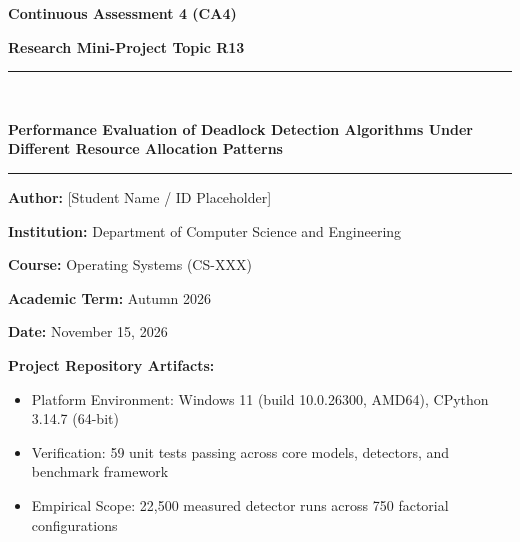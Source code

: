 \documentclass[11pt,a4paper]{article}
\begin{document}
\begin{titlepage}
    \centering
    \vspace*{1.5cm}
    
    {\Huge\bfseries Continuous Assessment 4 (CA4) \par}
    \vspace{0.4cm}
    {\LARGE\bfseries Research Mini-Project Topic R13 \par}
    \vspace{1.0cm}
    
    \rule{\linewidth}{1.2pt} \\[0.4cm]
    {\huge\bfseries Performance Evaluation of Deadlock Detection Algorithms Under Different Resource Allocation Patterns \par}
    \rule{\linewidth}{1.2pt}
    
    \vspace{2.0cm}
    
    {\Large\textbf{Author:} [Student Name / ID Placeholder] \par}
    \vspace{0.3cm}
    {\large\textbf{Institution:} Department of Computer Science and Engineering \par}
    \vspace{0.2cm}
    {\large\textbf{Course:} Operating Systems (CS-XXX) \par}
    \vspace{0.2cm}
    {\large\textbf{Academic Term:} Autumn 2026 \par}
    \vspace{0.2cm}
    {\large\textbf{Date:} November 15, 2026 \par}
    
    \vfill
    
    \begin{minipage}{0.9\textwidth}
        \small\textbf{Project Repository Artifacts:}
        \begin{itemize}\setlength{\itemsep}{0pt}
            \item Platform Environment: Windows 11 (build 10.0.26300, AMD64), CPython 3.14.7 (64-bit)
            \item Verification: 59 unit tests passing across core models, detectors, and benchmark framework
            \item Empirical Scope: 22,500 measured detector runs across 750 factorial configurations
        \end{itemize}
    \end{minipage}
    
    \vspace{1.0cm}
\end{titlepage}
\end{document}
